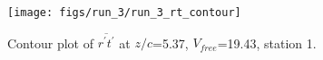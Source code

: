 \begin{figure}[H]
\centering
\texttt{[image: figs/run\_3/run\_3\_rt\_contour]}
\caption{Contour plot of $\overline{r^\prime t^\prime}$ at $z/c$=5.37, $V_{free}$=19.43, station 1.}
\label{fig:run_3_rt_contour}
\end{figure}


